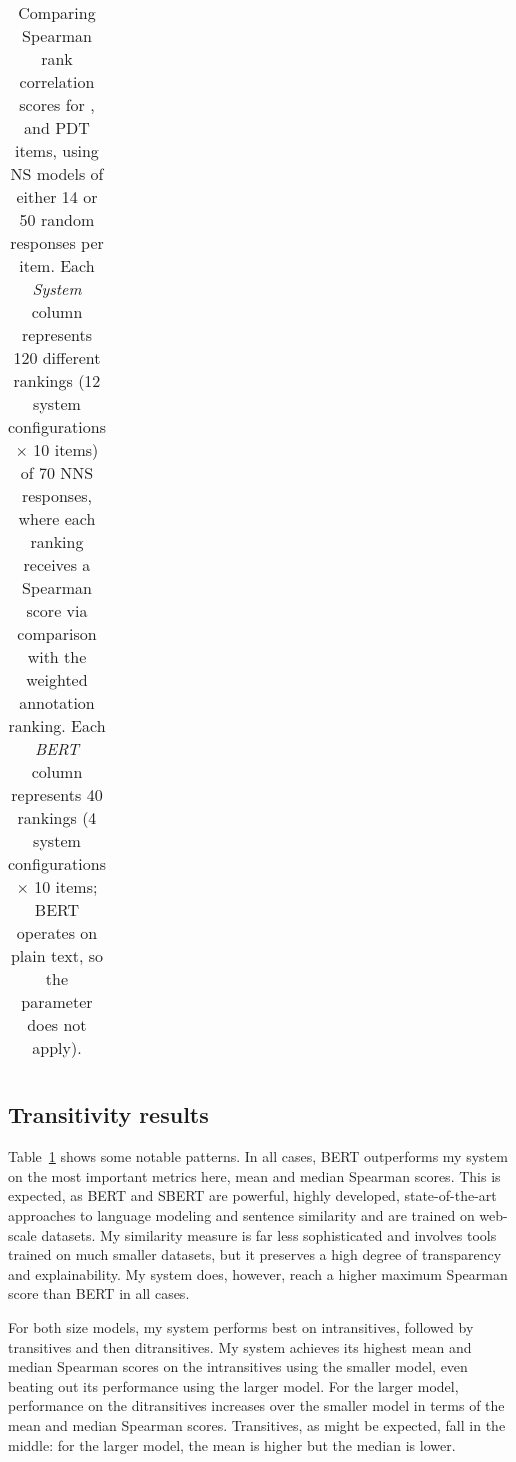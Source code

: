 \begin{table}[htb!]
\begin{center}
\begin{tabular}{|l||l|l||l|l||l|l|}
\hline
\end{tabular}
\caption{\label{tab:transitivity-results} Comparing Spearman rank correlation scores for ,  and  PDT items, using NS models of either 14 or 50 random responses per item. Each \textit{System} column represents 120 different rankings (12 system configurations $\times$ 10 items) of 70 NNS responses, where each ranking receives a Spearman score via comparison with the weighted annotation ranking. Each \textit{BERT} column represents 40 rankings (4 system configurations $\times$ 10 items; BERT operates on plain text, so the  parameter does not apply).
}
\end{center}
\end{table}



\subsection{Transitivity results}
\label{sec:transitivity-results}
Table~\ref{tab:transitivity-results} shows some notable patterns. In all cases, BERT outperforms my system on the most important metrics here, mean and median Spearman scores. This is expected, as BERT and SBERT are powerful, highly developed, state-of-the-art approaches to language modeling and sentence similarity and are trained on web-scale datasets. My similarity measure is far less sophisticated and involves tools trained on much smaller datasets, but it preserves a high degree of transparency and explainability. My system does, however, reach a higher maximum Spearman score than BERT in all cases.

For both size models, my system performs best on intransitives, followed by transitives and then ditransitives. My system achieves its highest mean and median Spearman scores on the intransitives using the smaller model, even beating out its performance using the larger model. For the larger model, performance on the ditransitives increases over the smaller model in terms of the mean and median Spearman scores. Transitives, as might be expected, fall in the middle: for the larger model, the mean is higher but the median is lower.

